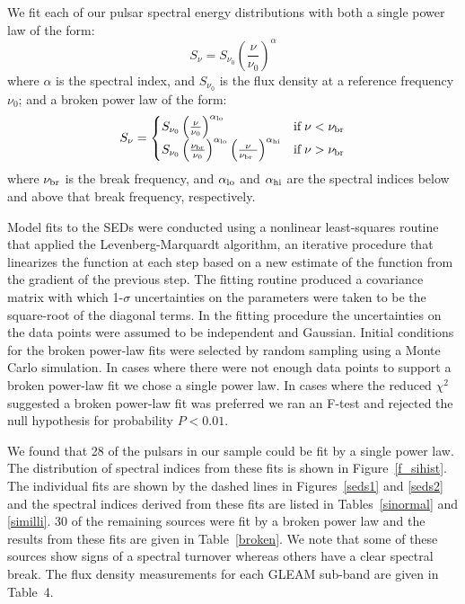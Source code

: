 \documentclass{pasa}%
\begin{document}
We fit each of our pulsar spectral energy distributions with both a
single power law of the form:
\begin{equation}
S_{\nu} = S_{\nu_0} \left( \frac{\nu}{\nu_0} \right)^\alpha
\end{equation}
where $\alpha$ is the spectral index, and $S_{\nu_0}$ is the flux density at a reference frequency $\nu_0$; and a broken power law of the
form:
\begin{equation}
S_{\nu} =
\begin{cases}
S_{\nu_0} \left( \frac{\nu}{\nu_0} \right)^{\alpha_{\rm lo}} &\text{if}\; \nu < \nu_{\rm br} \\
S_{\nu_0} \left( \frac{\nu_{\rm br}}{\nu_0} \right)^{\alpha_{\rm lo}} \left( \frac{\nu}{\nu_{\rm br}\
} \right)^{\alpha_{\rm hi}} &\text{if}\; \nu > \nu_{\rm br} \\
\end{cases}
\end{equation}
where $\nu_{\rm br}$ is the break frequency, and $\alpha_{\rm lo}$ and $\alpha_{\rm hi}$ are the spectral indices below
and above that break frequency, respectively.

Model fits to the SEDs were conducted using a nonlinear least-squares routine that applied the Levenberg-Marquardt algorithm, an iterative procedure that linearizes the function at each step based on a new estimate of the function from the gradient of the previous step. The fitting routine produced a covariance matrix with which 1-$\sigma$ uncertainties on the parameters were taken to be the square-root of the diagonal terms. In the fitting procedure the uncertainties on the data points were assumed to be independent and Gaussian. Initial conditions for the broken power-law fits were selected by random sampling using a Monte Carlo simulation.
In cases where there were not enough data points to support a broken power-law fit we chose a single power law. In cases where the reduced $\chi^2$ suggested a broken power-law fit was preferred we ran an F-test and rejected the null hypothesis for probability $P < 0.01$.

We found that 28 of the pulsars in our sample could be fit by a single power law. The distribution of spectral indices from these fits is shown in Figure~\ref{f_sihist}. The individual fits are shown by the dashed lines in Figures~\ref{seds1} and \ref{seds2} and the spectral indices derived from these fits are
listed in Tables~\ref{sinormal} and \ref{similli}.
30 of the remaining sources were fit by a broken power law and the results from these fits are given in Table~\ref{broken}. We note that some of these sources show signs of a spectral turnover whereas others have a clear spectral break. The flux density measurements for each GLEAM sub-band are
given in Table~4.
\end{document}

